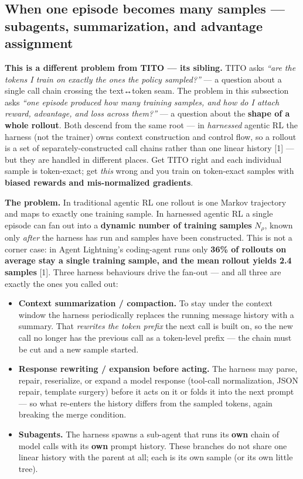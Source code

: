 \documentclass[
  paper=a4,
  ,captions=tableheading
]{scrartcl}
\providecommand{\tightlist}{%
  \setlength{\itemsep}{0pt}\setlength{\parskip}{0pt}}
\begin{document}
\hypertarget{when-one-episode-becomes-many-samples-subagents-summarization-and-advantage-assignment}{%
\subsection{When one episode becomes many samples --- subagents,
summarization, and advantage
assignment}\label{when-one-episode-becomes-many-samples-subagents-summarization-and-advantage-assignment}}

\textbf{This is a different problem from TITO --- its sibling.} TITO
asks \emph{``are the tokens I train on exactly the ones the policy
sampled?''} --- a question about a single call chain crossing the
text↔token seam. The problem in this subsection asks \emph{``one episode
produced how many training samples, and how do I attach reward,
advantage, and loss across them?''} --- a question about the
\textbf{shape of a whole rollout}. Both descend from the same root ---
in \emph{harnessed} agentic RL the harness (not the trainer) owns
context construction and control flow, so a rollout is a set of
separately-constructed call chains rather than one linear history
{[}1{]} --- but they are handled in different places. Get TITO right and
each individual sample is token-exact; get \emph{this} wrong and you
train on token-exact samples with \textbf{biased rewards and
mis-normalized gradients}.

\textbf{The problem.} In traditional agentic RL one rollout is one
Markov trajectory and maps to exactly one training sample. In harnessed
agentic RL a single episode can fan out into a \textbf{dynamic number of
training samples} \(N_\rho\), known only \emph{after} the harness has
run and samples have been constructed. This is not a corner case: in
Agent Lightning's coding-agent runs only \textbf{36\% of rollouts on
average stay a single training sample, and the mean rollout yields 2.4
samples} {[}1{]}. Three harness behaviours drive the fan-out --- and all
three are exactly the ones you called out:

\begin{itemize}
\tightlist
\item
  \textbf{Context summarization / compaction.} To stay under the context
  window the harness periodically replaces the running message history
  with a summary. That \emph{rewrites the token prefix} the next call is
  built on, so the new call no longer has the previous call as a
  token-level prefix --- the chain must be cut and a new sample started.
\item
  \textbf{Response rewriting / expansion before acting.} The harness may
  parse, repair, reserialize, or expand a model response (tool-call
  normalization, JSON repair, template surgery) before it acts on it or
  folds it into the next prompt --- so what re-enters the history
  differs from the sampled tokens, again breaking the merge condition.
\item
  \textbf{Subagents.} The harness spawns a sub-agent that runs its
  \textbf{own} chain of model calls with its \textbf{own} prompt
  history. These branches do not share one linear history with the
  parent at all; each is its own sample (or its own little tree).
\end{itemize}
\end{document}
